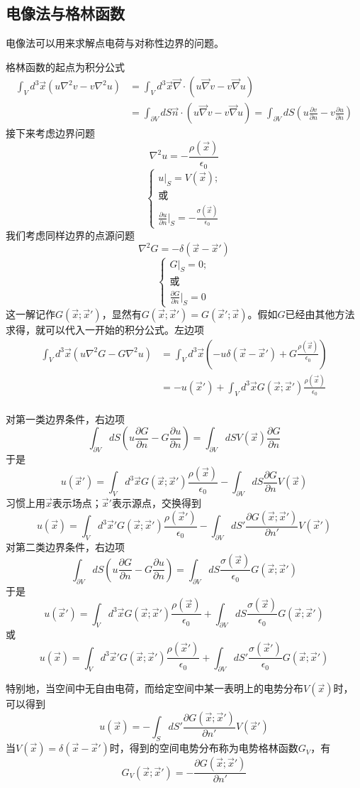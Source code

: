 \documentclass[a4paper,11pt]{ctexbook}
\newcommand{\beq}{\begin{equation}}
\newcommand{\eeq}{\end{equation}}
\newcommand{\bea}{\begin{equation}\begin{aligned}}
\newcommand{\eea}{\end{aligned}\end{equation}}
\newcommand{\del}{\vec{\nabla}}
\newcommand{\pfrac}[2]{\frac{\partial #1}{\partial #2}}
\begin{document}
\subsection{电像法与格林函数}
电像法可以用来求解点电荷与对称性边界的问题。\par
格林函数的起点为积分公式
\bea
\int_V d^3 \vec{x} (u \nabla^2 v -v \nabla^2 u) &= \int_V d^3 \vec{x} \del \cdot( u \del v -v \del u) \\
&= \int_{\partial V} dS \vec n \cdot ( u \del v -v \del u) = \int_{\partial V} dS ( u \pfrac{v}{n} -v \pfrac{u}{n})
\eea
接下来考虑边界问题
\beq
\nabla^2 u = -\frac{\rho(\vec x)}{\epsilon_0}
\eeq
\beq
\begin{cases}
u\big|_{S} = V(\vec x) ;\\
\text{或} \\
\pfrac{u}{n}\big|_{S} = -\frac{\sigma(\vec{x})}{\epsilon_0}
\end{cases}
\eeq
我们考虑同样边界的点源问题
\beq
\nabla^2 G = -\delta(\vec x - \vec{x}')
\eeq
\beq
\begin{cases}
G\big|_{S} = 0 ;\\
\text{或} \\
\pfrac{G}{n}\big|_{S} = 0
\end{cases}
\eeq
这一解记作$G(\vec x; \vec{x}')$，显然有$G(\vec x; \vec{x}') = G(\vec{x}'; \vec{x}) $。假如$G$已经由其他方法求得，就可以代入一开始的积分公式。左边项
\bea
\int_V d^3 \vec{x} (u \nabla^2 G -G \nabla^2 u)  &= \int_V d^3 \vec{x} (-u\delta(\vec x - \vec{x}') + G \frac{\rho(\vec x)} {\epsilon_0}) \\
&= -u(\vec{x}') + \int_V d^3 \vec{x} G(\vec x; \vec{x}') \frac{\rho(\vec x)} {\epsilon_0}\\
\eea
\par
对第一类边界条件，右边项
\beq
\int_{\partial V} dS ( u \pfrac{G}{n} -G \pfrac{u}{n}) = \int_{\partial V} dS V(\vec x)  \pfrac{G}{n} 
\eeq
于是
\beq
u(\vec{x}') = \int_V d^3 \vec{x} G(\vec x; \vec{x}') \frac{\rho(\vec x)} {\epsilon_0} - \int_{\partial V} dS  \pfrac{G}{n} V(\vec x) 
\eeq
习惯上用$\vec{x}$表示场点；$\vec{x}'$表示源点，交换得到
\beq
u(\vec{x}) = \int_V d^3 \vec{x}' G(\vec x; \vec{x}') \frac{\rho(\vec{x}')} {\epsilon_0} - \int_{\partial V} dS' \pfrac{G(\vec x; \vec{x}')}{n'} V(\vec x')  
\eeq
对第二类边界条件，右边项
\beq
\int_{\partial V} dS ( u \pfrac{G}{n} -G \pfrac{u}{n}) = \int_{\partial V} dS  \frac{\sigma(\vec{x})}{\epsilon_0}G(\vec x; \vec{x}' )
\eeq
于是
\beq
u(\vec{x}') = \int_V d^3 \vec{x} G(\vec x; \vec{x}') \frac{\rho(\vec x)} {\epsilon_0} + \int_{\partial V} dS \frac{\sigma(\vec{x})} {\epsilon_0}G(\vec x; \vec{x}' )
\eeq
或
\beq
u(\vec{x}) = \int_V d^3 \vec{x}' G(\vec x; \vec{x}') \frac{\rho(\vec{x}')} {\epsilon_0} + \int_{\partial V} dS' \frac{\sigma(\vec{x}')}{\epsilon_0} G(\vec x; \vec{x}' )
\eeq
\par
特别地，当空间中无自由电荷，而给定空间中某一表明上的电势分布$V(\vec x)$时，可以得到
\beq
u(\vec{x}) = - \int_{S} dS' \pfrac{G(\vec x; \vec{x}')}{n'} V(\vec x')  
\eeq
当$V(\vec x ) = \delta ( \vec x- \vec x ')$时，得到的空间电势分布称为电势格林函数$G_V$，有
\beq
G_V(\vec{x};\vec{x}') = -\pfrac{G(\vec x; \vec{x}')}{n'}
\eeq
\end{document}
